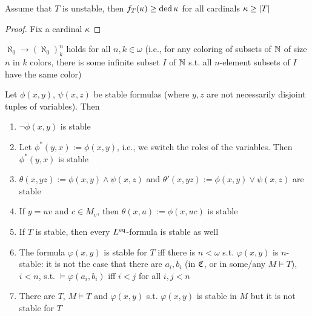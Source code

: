 \documentclass[11pt]{article}
\begin{document}
\begin{proposition}[]
Assume that \(T\) is unstable, then \(f_T(\kappa)\ge\operatorname{ded}\kappa\) for all cardinals \(\kappa\ge\abs{T}\)
\end{proposition}

\begin{proof}
Fix a cardinal \(\kappa\)
\end{proof}

\begin{fact}[Ramsey]
\(\aleph_0\to(\aleph_0)^n_k\) holds for all \(n,k\in\omega\) (i.e., for any coloring of subsets of \(\mathbb{N}\) of size
\(n\) in \(k\) colors, there is some infinite subset \(I\) of \(\mathbb{N}\) s.t. all \(n\)-element
subsets of \(I\) have the same color)
\end{fact}

\begin{lemma}[]
Let \(\phi(x,y)\), \(\psi(x,z)\) be stable formulas (where \(y,z\) are not necessarily disjoint tuples
of variables). Then
\begin{enumerate}
\item \(\neg\phi(x,y)\) is stable
\item Let \(\phi^*(y,x):=\phi(x,y)\), i.e., we switch the roles of the variables. Then \(\phi^*(y,x)\) is
stable
\item \(\theta(x,yz):=\phi(x,y)\wedge\psi(x,z)\) and \(\theta'(x,yz):=\phi(x,y)\vee\psi(x,z)\) are stable
\item If \(y=uv\) and \(c\in M_v\), then \(\theta(x,u):=\phi(x,uc)\) is stable
\item If \(T\) is stable, then every \(L^{\operatorname{eq}}\)-formula is stable as well
\item The formula \(\varphi(x,y)\) is stable for \(T\) iff there is \(n<\omega\) s.t. \(\varphi(x,y)\)
is \(n\)-stable: it is not the case that there are \(a_i,b_i\) (in \(\mathfrak{C}\), or in
some/any \(M\vDash T\)), \(i< n\), s.t. \(\vDash\varphi(a_i,b_i)\) iff \(i< j\) for all \(i,j< n\)
\item There are \(T\), \(M\vDash T\) and \(\varphi(x,y)\) s.t. \(\varphi(x,y)\) is stable in \(M\) but it is not
stable for \(T\)
\end{enumerate}
\end{lemma}
\end{document}
